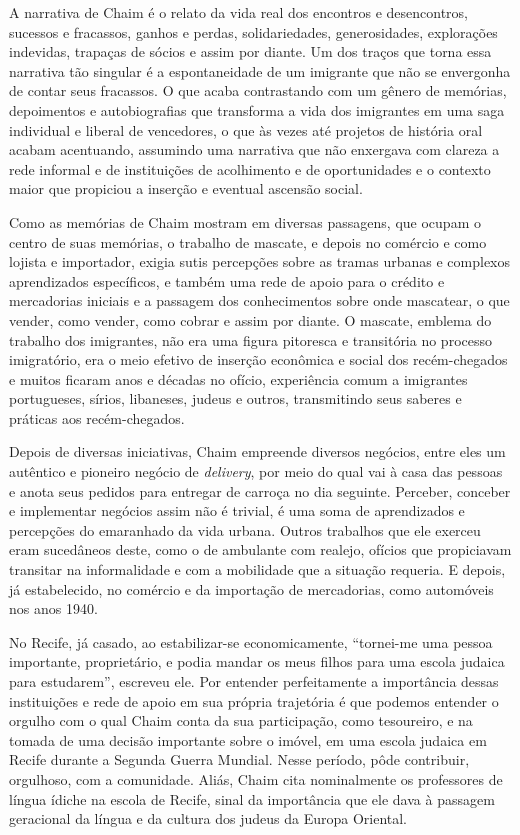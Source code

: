 A narrativa de Chaim é o relato da vida real dos encontros e
desencontros, sucessos e fracassos, ganhos e perdas, solidariedades,
generosidades, explorações indevidas, trapaças de sócios e assim por
diante. Um dos traços que torna essa narrativa tão singular é a
espontaneidade de um imigrante que não se envergonha de contar seus
fracassos. O que acaba contrastando com um gênero de memórias,
depoimentos e autobiografias que transforma a vida dos imigrantes em uma
saga individual e liberal de vencedores, o que às vezes até projetos de
história oral acabam acentuando, assumindo uma narrativa que não
enxergava com clareza a rede informal e de instituições de acolhimento e
de oportunidades e o contexto maior que propiciou a inserção e eventual
ascensão social.

Como as memórias de Chaim mostram em diversas passagens, que ocupam o
centro de suas memórias, o trabalho de mascate, e depois no comércio e
como lojista e importador, exigia sutis percepções sobre as tramas
urbanas e complexos aprendizados específicos, e também uma rede de apoio
para o crédito e mercadorias iniciais e a passagem dos conhecimentos
sobre onde mascatear, o que vender, como vender, como cobrar e assim por
diante. O mascate, emblema do trabalho dos imigrantes, não era uma
figura pitoresca e transitória no processo imigratório, era o meio
efetivo de inserção econômica e social dos recém-chegados e muitos
ficaram anos e décadas no ofício, experiência comum a imigrantes
portugueses, sírios, libaneses, judeus e outros, transmitindo seus
saberes e práticas aos recém-chegados.

Depois de diversas iniciativas, Chaim empreende diversos negócios, entre
eles um autêntico e pioneiro negócio de \textit{delivery}, por meio do qual
vai à casa das pessoas e anota seus pedidos para entregar de carroça no
dia seguinte. Perceber, conceber e implementar negócios assim não é
trivial, é uma soma de aprendizados e percepções do emaranhado da vida
urbana. Outros trabalhos que ele exerceu eram sucedâneos deste, como o
de ambulante com realejo, ofícios que propiciavam transitar na
informalidade e com a mobilidade que a situação requeria. E depois, já
estabelecido, no comércio e da importação de mercadorias, como
automóveis nos anos 1940.

No Recife, já casado, ao estabilizar-se economicamente, ``tornei-me uma
pessoa importante, proprietário, e podia mandar os meus filhos para uma
escola judaica para estudarem'', escreveu ele. Por entender
perfeitamente a importância dessas instituições e rede de apoio em sua
própria trajetória é que podemos entender o orgulho com o qual Chaim
conta da sua participação, como tesoureiro, e na tomada de uma decisão
importante sobre o imóvel, em uma escola judaica em Recife durante a
Segunda Guerra Mundial. Nesse período, pôde contribuir, orgulhoso, com a
comunidade. Aliás, Chaim cita nominalmente os professores de língua
ídiche na escola de Recife, sinal da importância que ele dava à passagem
geracional da língua e da cultura dos judeus da Europa Oriental.

